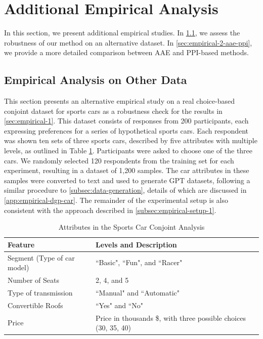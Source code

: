 
\section{Additional Empirical Analysis}
\label{sec:empirical-2}
In this section, we present additional empirical studies. In \cref{sec:empirical-2-car}, we assess the robustness of our method on an alternative dataset. In \cref{sec:empirical-2-aae-ppi}, we provide a more detailed comparison between AAE and PPI-based methods. 

\subsection{Empirical Analysis on Other Data}
\label{sec:empirical-2-car}

This section presents an alternative empirical study on a real choice-based conjoint dataset for sports cars \citep{sccdata} as a robustness check for the results in \cref{sec:empirical-1}. 
This dataset consists of responses from 200 participants, each expressing preferences for a series of hypothetical sports cars. Each respondent was shown ten sets of three sports cars, described by five attributes with multiple levels, as outlined in Table \ref{tab:attributes-2}.  Participants were asked to choose one of the three cars. 
We randomly selected 120 respondents from the training set for each experiment, resulting in a dataset of 1,200 samples. The car attributes in these samples were converted to text and used to generate GPT datasets, following a similar procedure to \cref{subsec:data-generation}, details of which are discussed in \cref{app:empirical-dgp-car}. The remainder of the experimental setup is also consistent with the approach described in \cref{subsec:empirical-setup-1}. 



\begin{table}[!t]
\renewcommand{\arraystretch}{1.5}
\centering
{\footnotesize
\caption{Attributes in the Sports Car Conjoint Analysis}
\label{tab:attributes-2}
\begin{tabular}{p{45mm}p{112mm}}\hline\hline
\multicolumn{1}{l}{\textbf{Feature}}
 &  
 \multicolumn{1}{l}{\textbf{Levels and Description}}
 \\\hline
{Segment (Type of car model)}     & ``Basic", ``Fun", and ``Racer"                  
\\\hline
{Number of Seats} & 2, 4, and 5
\\\hline
{Type of transmission}  & ``Manual" and ``Automatic"
\\\hline
{Convertible Roofs}  & ``Yes" and ``No"
\\\hline
{Price} & Price in thousands \$, with three possible choices (30, 35, 40)
\\\hline \hline
\end{tabular}
}
\end{table}

